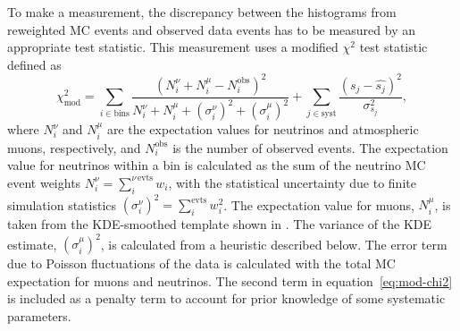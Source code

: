 To make a measurement, the discrepancy between the histograms from reweighted MC events and observed data events has to be measured by an appropriate test statistic. This measurement uses a modified $\chi^2$ test statistic defined as
\begin{equation}
\chi^2_{\mathrm{mod}} = \sum_{i \in \mathrm{bins}}^{}\frac{(N^{\nu}_i + N^{\mu}_i - N^{\mathrm{obs}}_i)^2}{N^{\nu}_i + N^{\mu}_i + (\sigma^{\nu}_i)^2 + (\sigma^{\mu}_i)^2} + \sum_{j \in \mathrm{syst}}^{}\frac{(s_j - \hat{s_j})^2}{\sigma^2_{s_j}},
\label{eq:mod-chi2}
\end{equation}
\noindent where $N^{\nu}_i$ and $N^{\mu}_i$ are the expectation values for neutrinos and atmospheric muons, respectively, and $N^{\mathrm{obs}}_i$ is the number of observed events. The expectation value for neutrinos within a bin is calculated as the sum of the neutrino MC event weights $N^{\nu}_i = \sum_{i}^{\nu\,\mathrm{evts}} w_i$, with the statistical uncertainty due to finite simulation statistics $(\sigma^{\nu}_i)^2 = \sum_{i}^{\mathrm{evts}} w_i^2$. The expectation value for muons, $N^{\mu}_i$, is taken from the KDE-smoothed template shown in . The variance of the KDE estimate, $(\sigma^{\mu}_i)^2$, is calculated from a heuristic described below. The error term due to Poisson fluctuations of the data is calculated with the total MC expectation for muons and neutrinos. The second term in equation~\ref{eq:mod-chi2} is included as a penalty term to account for prior knowledge of some systematic parameters. 

